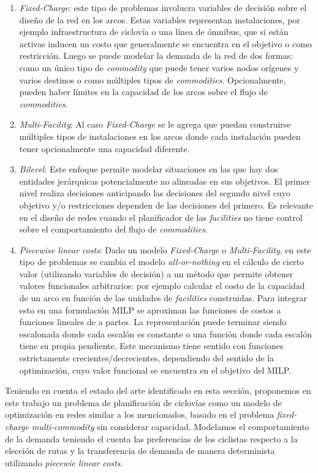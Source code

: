  \begin{enumerate}
    \item{{\it Fixed-Charge}: este tipo de problemas involucra variables de decisión sobre el diseño de la red en los arcos. Estas variables representan instalaciones, por ejemplo infraestructura de ciclovía o una línea de ómnibus, que si están activas inducen un costo que generalmente se encuentra en el objetivo o como restricción. Luego se puede modelar la demanda de la red de dos formas: como un único tipo de {\it commodity} que puede tener varios nodos orígenes y varios destinos o como múltiples tipos de {\it commodities}. Opcionalmente, pueden haber límites en la capacidad de los arcos sobre el flujo de {\it commodities}.}
    \item{{\it Multi-Facility}: Al caso {\it Fixed-Charge} se le agrega que puedan construirse múltiples tipos de instalaciones en los arcos donde cada instalación pueden tener opcionalmente una capacidad diferente.}
    \item{{\it Bilevel}: Este enfoque permite modelar situaciones en las que hay dos entidades jerárquicas potencialmente no alineadas en sus objetivos. El primer nivel realiza decisiones anticipando las decisiones del segundo nivel cuyo objetivo y/o restricciones dependen de las decisiones del primero. Es relevante en el diseño de redes cuando el planificador de las {\it facilities} no tiene control sobre el comportamiento del flujo de {\it commodities}.}
    \item{{\it Piecewise linear costs}: Dado un modelo {\it Fixed-Charge} o {\it Multi-Facility}, en este tipo de problemas se cambia el modelo {\it all-or-nothing} en el cálculo de cierto valor (utilizando variables de decisión) a un método que permite obtener valores funcionales arbitrarios: por ejemplo calcular el costo de la capacidad de un arco en función de las unidades de {\it facilities} construidas. Para integrar esto en una formulación MILP se aproximan las funciones de costos a funciones lineales de a partes. La representación puede terminar siendo escalonada donde cada escalón es constante o una función donde cada escalón tiene su propia pendiente. Este mecanismo tiene sentido con funciones estrictamente crecientes/decrecientes, dependiendo del sentido de la optimización, cuyo valor funcional se encuentra en el objetivo del MILP.}
  \end{enumerate}

  Teniendo en cuenta el estado del arte identificado en esta sección, proponemos en este trabajo un problema de planificación de ciclovías como un modelo de optimización en redes similar a los mencionados, basado en el problema {\it fixed-charge multi-commodity} sin considerar capacidad. Modelamos el comportamiento de la demanda teniendo el cuenta las preferencias de los ciclistas respecto a la elección de rutas y la transferencia de demanda de manera determinista utilizando {\it piecewie linear costs}.

